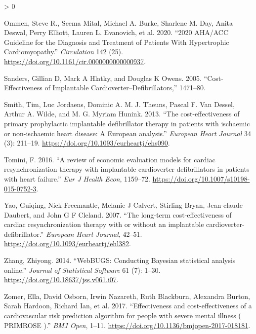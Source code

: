 \documentclass[
]{article}
\newlength{\cslhangindent}
\newenvironment{CSLReferences}[2] %
 {%
  \setlength{\parindent}{0pt}
  \ifodd #1 \everypar{\setlength{\hangindent}{\cslhangindent}}\ignorespaces\fi
  \ifnum #2 > 0
  \setlength{\parskip}{#2\baselineskip}
  \fi
 }%
 {}
\begin{document}
\begin{CSLReferences}{1}{0}
\leavevmode\hypertarget{ref-Ommen2020}{}%
Ommen, Steve R., Seema Mital, Michael A. Burke, Sharlene M. Day, Anita Deswal, Perry Elliott, Lauren L. Evanovich, et al. 2020. {``{2020 AHA/ACC Guideline for the Diagnosis and Treatment of Patients With Hypertrophic Cardiomyopathy}.''} \emph{Circulation} 142 (25). \url{https://doi.org/10.1161/cir.0000000000000937}.

\leavevmode\hypertarget{ref-Sanders2005}{}%
Sanders, Gillian D, Mark A Hlatky, and Douglas K Owens. 2005. {``{Cost-Effectiveness of Implantable Cardioverter--Defibrillators},''} 1471--80.

\leavevmode\hypertarget{ref-Smith2013}{}%
Smith, Tim, Luc Jordaens, Dominic A. M. J. Theuns, Pascal F. Van Dessel, Arthur A. Wilde, and M. G. Myriam Hunink. 2013. {``{The cost-effectiveness of primary prophylactic implantable defibrillator therapy in patients with ischaemic or non-ischaemic heart disease: A European analysis}.''} \emph{European Heart Journal} 34 (3): 211--19. \url{https://doi.org/10.1093/eurheartj/ehs090}.

\leavevmode\hypertarget{ref-Tomini2016}{}%
Tomini, F. 2016. {``{A review of economic evaluation models for cardiac resynchronization therapy with implantable cardioverter defibrillators in patients with heart failure}.''} \emph{Eur J Health Econ}, 1159--72. \url{https://doi.org/10.1007/s10198-015-0752-3}.

\leavevmode\hypertarget{ref-Yao2007}{}%
Yao, Guiqing, Nick Freemantle, Melanie J Calvert, Stirling Bryan, Jean-claude Daubert, and John G F Cleland. 2007. {``{The long-term cost-effectiveness of cardiac resynchronization therapy with or without an implantable cardioverter-defibrillator}.''} \emph{European Heart Journal}, 42--51. \url{https://doi.org/10.1093/eurheartj/ehl382}.

\leavevmode\hypertarget{ref-Zhang2014}{}%
Zhang, Zhiyong. 2014. {``{WebBUGS: Conducting Bayesian statistical analysis online}.''} \emph{Journal of Statistical Software} 61 (7): 1--30. \url{https://doi.org/10.18637/jss.v061.i07}.

\leavevmode\hypertarget{ref-Zomer2017}{}%
Zomer, Ella, David Osborn, Irwin Nazareth, Ruth Blackburn, Alexandra Burton, Sarah Hardoon, Richard Ian, et al. 2017. {``{Effectiveness and cost-effectiveness of a cardiovascular risk prediction algorithm for people with severe mental illness ( PRIMROSE )}.''} \emph{BMJ Open}, 1--11. \url{https://doi.org/10.1136/bmjopen-2017-018181}.

\end{CSLReferences}
\end{document}
